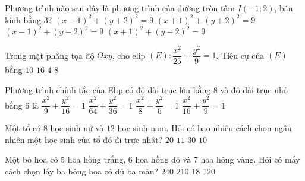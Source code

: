 \begin{ex}%
	Phương trình nào sau đây là phương trình của đường tròn tâm $I(-1;2)$, bán kính bằng $3$?
	\choice
	{$(x-1)^2+(y+2)^2=9$}
	{$(x+1)^2+(y+2)^2=9$}
	{$(x-1)^2+(y-2)^2=9$}
	{$(x+1)^2+(y-2)^2=9$}
\end{ex}

\begin{ex}%
	Trong mặt phẳng tọa độ $Oxy$, cho elip $(E) \colon \dfrac{x^2}{25}+\dfrac{y^2}{9}=1$. Tiêu cự của $(E)$ bằng
	\choice
	{$10$}
	{$16$}
	{$4$}
	{$8$}
\end{ex}

\begin{ex}%
	Phương trình chính tắc của Elip có độ dài trục lớn bằng $8$ và độ dài trục nhỏ bằng $6$ là
	\choice
	{$\dfrac{x^2}{9}+\dfrac{y^2}{16}=1$}
	{$\dfrac{x^2}{64}+\dfrac{y^2}{36}=1$}
	{$\dfrac{x^2}{8}+\dfrac{y^2}{6}=1$}
	{$\dfrac{x^2}{16}+\dfrac{y^2}{9}=1$}
\end{ex}


\begin{ex}%
	Một tổ có $8$ học sinh nữ và $12$ học sinh nam. Hỏi có bao nhiêu cách chọn ngẫu nhiên một học sinh của tổ đó đi trực nhật?
	\choice
	{\True $20$}
	{$11$}
	{$30$}
	{$10$}
\end{ex}

\begin{ex}%
	Một bó hoa có $5$ hoa hồng trắng, $6$ hoa hồng đỏ và $7$ hoa hông vàng. Hỏi có mấy cách chọn lấy ba bông hoa có đủ ba màu?
	\choice
	{$240$}
	{\True $210$}
	{$18$}
	{$120$}
\end{ex}

